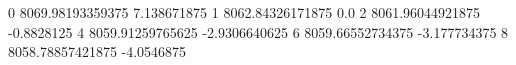 0 8069.98193359375 7.138671875
1 8062.84326171875 0.0
2 8061.96044921875 -0.8828125
4 8059.91259765625 -2.9306640625
6 8059.66552734375 -3.177734375
8 8058.78857421875 -4.0546875
